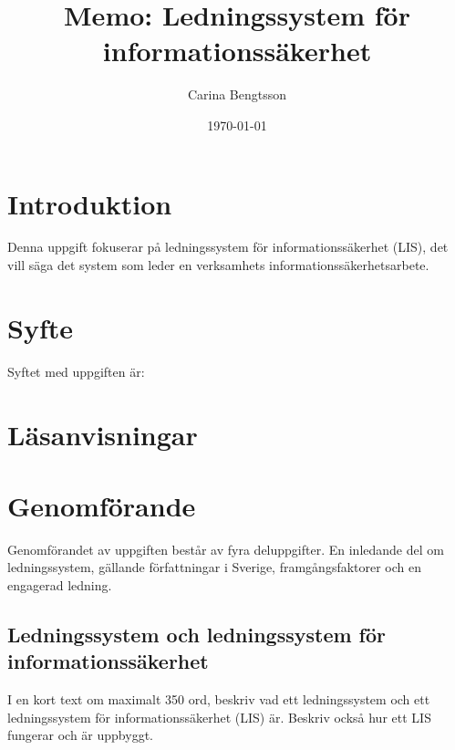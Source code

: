 \documentclass[a4paper]{llncs}
\begin{document}
\title{Memo: Ledningssystem för informationssäkerhet}
\author{%
  Carina Bengtsson
}
\date{\today}

\maketitle


\section{Introduktion}
\label{sec:introduction}
\noindent
Denna uppgift fokuserar på ledningssystem för informationssäkerhet (LIS), det 
vill säga det system som leder en verksamhets informationssäkerhetsarbete.


\section{Syfte}
\label{sec:aim}
\noindent
Syftet med uppgiften är:
\begin{itemize}
  
\end{itemize}


\section{Läsanvisningar}
\noindent



\section{Genomförande}\label{Work}
\noindent
Genomförandet av uppgiften består av fyra deluppgifter.
En inledande del om ledningssystem, gällande författningar i Sverige, 
framgångsfaktorer och en engagerad ledning.

\subsection{Ledningssystem och ledningssystem för informationssäkerhet}
\noindent
I en kort text om maximalt 350 ord, beskriv vad ett ledningssystem och ett 
ledningssystem för informationssäkerhet (LIS) är.
Beskriv också hur ett LIS fungerar och är uppbyggt.
\end{document}

